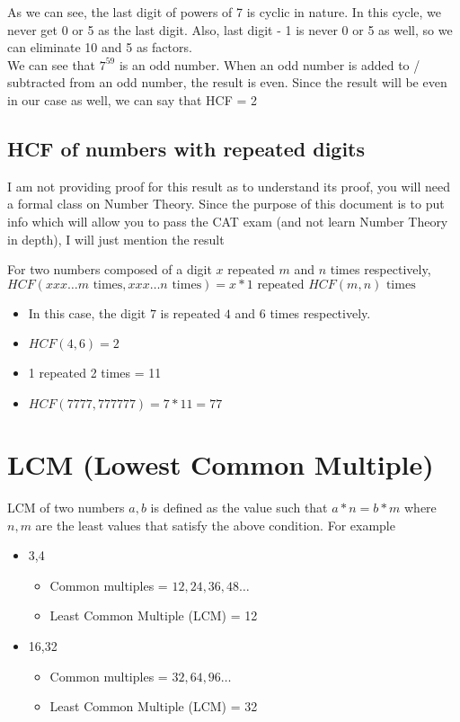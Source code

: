 As we can see, the last digit of powers of 7 is cyclic in nature. In this cycle, we never get 0 or 5 as the last digit. Also, last digit - 1 is never 0 or 5 as well, so we can eliminate 10 and 5 as factors. \\

We can see that $7^{59}$ is an odd number. When an odd number is added to / subtracted from an odd number, the result is even. Since the result will be even in our case as well, we can say that HCF = 2 

\subsection{HCF of numbers with repeated digits}

\begin{NOTE}
    I am not providing proof for this result as to understand its proof, you will need a formal class on Number Theory. Since the purpose of this document is to put info which will allow you to pass the CAT exam (and not learn Number Theory in depth), I will just mention the result 
\end{NOTE}

For two numbers composed of a digit $x$ repeated $m$ and $n$ times respectively, $HCF(xxx\ldots m\text{ times},xxx\ldots n\text{ times}) = x * 1 \text{ repeated } HCF(m,n) \text{ times}$

\begin{itemize}
    \item In this case, the digit $7$ is repeated $4$ and $6$ times respectively. 
    \item $HCF(4,6) = 2$
    \item 1 repeated 2 times = 11
    \item $HCF(7777,777777) = 7 * 11 = 77$
\end{itemize}

\section{LCM (Lowest Common Multiple)}

LCM of two numbers $a,b$ is defined as the value such that $a * n = b * m $ where $n,m$ are the least values that satisfy the above condition. For example
\begin{itemize}
    \item 3,4
    \begin{itemize}
        \item Common multiples = $12,24,36,48\ldots$
        \item Least Common Multiple (LCM) = 12
    \end{itemize}
    \item 16,32
    \begin{itemize}
        \item Common multiples = $32,64,96\ldots$
        \item Least Common Multiple (LCM) = 32
    \end{itemize}
\end{itemize}

